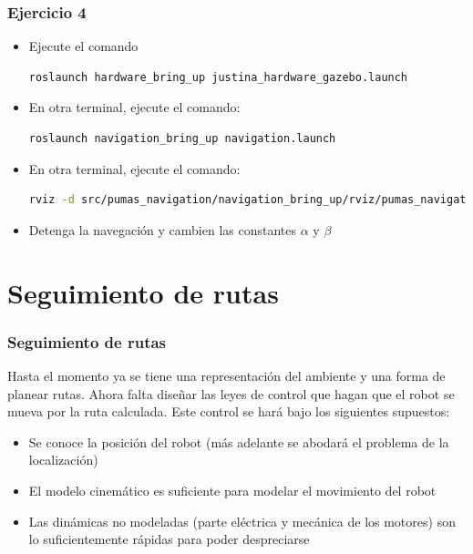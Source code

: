 \begin{frame}[containsverbatim]\frametitle{Ejercicio 4}
  \begin{itemize}
  \item Ejecute el comando
    \begin{lstlisting}[language=bash]
      roslaunch hardware_bring_up justina_hardware_gazebo.launch
    \end{lstlisting}
  \item En otra terminal, ejecute el comando:
    \begin{lstlisting}[language=bash]
      roslaunch navigation_bring_up navigation.launch
    \end{lstlisting}
  \item En otra terminal, ejecute el comando:
    \begin{lstlisting}[language=bash]
    rviz -d src/pumas_navigation/navigation_bring_up/rviz/pumas_navigation.rviz
  \end{lstlisting}
  \item Detenga la navegación y cambien las constantes $\alpha$ y $\beta$
  \end{itemize}
\end{frame}


\section{Seguimiento de rutas}
\begin{frame}\frametitle{Seguimiento de rutas}
  Hasta el momento ya se tiene una representación del ambiente y una forma de planear rutas. Ahora falta diseñar las leyes de control que hagan que el robot se mueva por la ruta calculada. Este control se hará bajo los siguientes supuestos:
  \begin{itemize}
  \item Se conoce la posición del robot (más adelante se abodará el problema de la localización)
  \item El modelo cinemático es suficiente para modelar el movimiento del robot 
  \item Las dinámicas no modeladas (parte eléctrica y mecánica de los motores) son lo suficientemente rápidas para poder despreciarse
  \end{itemize}
\end{frame}

